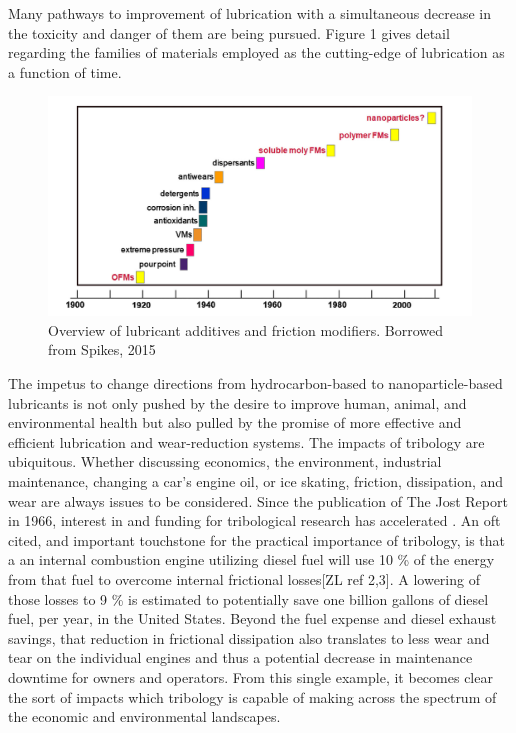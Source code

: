 Many pathways to improvement of lubrication with a simultaneous decrease in the toxicity and danger of them are being pursued. Figure 1 gives detail regarding the families of materials employed as the cutting-edge of lubrication as a function of time.

\begin{figure}[hbtp]
	\centering
	\includegraphics[width=1.0\textwidth]{Chapter-1/fig1_spikes_timeline}
	\caption{Overview of lubricant additives and friction modifiers. Borrowed from Spikes, 2015}
	\label{fig1-spikes-timeline}
\end{figure}


The impetus to change directions from hydrocarbon-based to nanoparticle-based lubricants is not only pushed by the desire to improve human, animal, and environmental health but also pulled by the promise of more effective and efficient lubrication and wear-reduction systems. The impacts of tribology are ubiquitous. Whether discussing economics, the environment, industrial maintenance, changing a car's engine oil, or ice skating,  friction, dissipation, and wear are always issues to be considered. Since the publication of The Jost Report in 1966, interest in and funding for tribological research has accelerated \cite{101}. An oft cited, and important touchstone for the practical importance of tribology, is that a an internal combustion engine utilizing diesel fuel will use 10 \% of the energy from that fuel to overcome internal frictional losses[ZL ref 2,3]. A lowering of those losses to 9 \% is estimated to potentially save one billion gallons of diesel fuel, per year, in the United States. Beyond the fuel expense and diesel exhaust savings, that reduction in frictional dissipation also translates to less wear and tear on the individual engines and thus a potential decrease in maintenance downtime for owners and operators. From this single example, it becomes clear the sort of impacts which tribology is capable of making across the spectrum of the economic and environmental landscapes.


